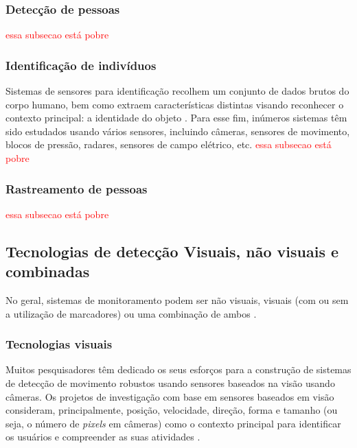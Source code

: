 \subsubsection{Detecção de pessoas}\label{sec:deteccao-movimento}
 
 \textcolor{red}{essa subsecao está pobre}
 
\subsubsection{Identificação de indivíduos}\label{sec:identificacao-pessoas}

Sistemas de sensores para identificação recolhem um conjunto de dados brutos do corpo humano, bem como extraem características distintas visando reconhecer o contexto principal: a identidade do objeto \cite{yun2014human}. Para esse fim, inúmeros sistemas têm sido estudados usando vários sensores, incluindo câmeras, sensores de movimento, blocos de pressão, radares, sensores de campo elétrico, etc.
\textcolor{red}{essa subsecao está pobre}
 
\subsubsection{Rastreamento de pessoas}\label{sec:rastre-amb-fec}

 \textcolor{red}{essa subsecao está pobre}

\subsection{Tecnologias de detecção Visuais, não visuais e combinadas}\label{sec:tec-rastreamento}
No geral, sistemas de monitoramento podem ser não visuais, visuais (com ou sem a utilização de marcadores) ou uma combinação de ambos \cite{zhou2008human}.

\subsubsection{Tecnologias visuais}\label{sec:sens-genericos}
Muitos pesquisadores têm dedicado os seus esforços para a construção de sistemas de detecção de movimento robustos usando sensores baseados na visão usando câmeras. Os projetos de investigação com base em sensores baseados em visão consideram, principalmente, posição, velocidade, direção, forma e tamanho (ou seja, o número de \textit{pixels} em câmeras) como o contexto principal para identificar os usuários e compreender as suas atividades \cite{stauffer200l}.

